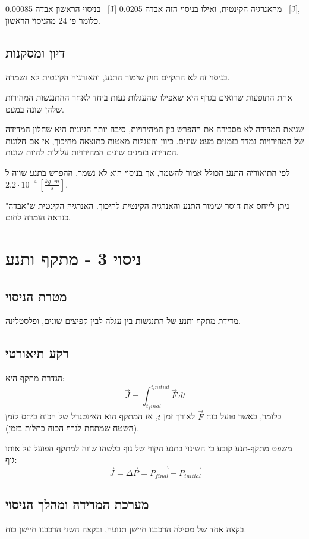 \documentclass[14pt]{extarticle}
\begin{document}
בניסוי הראשון אבדה 0.00085 \, [J] מהאנרגיה הקינטית, ואילו בניסוי הזה אבדה 0.0205 \, [J], כלומר פי 24 מהניסוי הראשון.

\subsection*{דיון ומסקנות}

בניסוי זה לא התקיים חוק שימור התנע, והאנרגיה הקינטית לא נשמרה.

אחת התופעות שרואים בגרף היא שאפילו שהעגלות נעות ביחד  לאחר ההתנגשות המהירות שלהן שונה במעט.

שגיאת המדידה לא מסבירה את ההפרש בין המהירויות, סיבה יותר  הגיונית היא שחלון המדידה של המהירויות נמדד בזמנים מעט שונים.
כיוון והעגלות  מאטות כתוצאה מחיכוך, אז אם חלונות המדידה בזמנים שונים המהירויות עלולות להיות שונות.

לפי התיאוריה התנע הכולל אמור להשמר, אך בניסוי הוא לא נשמר. ההפרש בתנע שווה ל $2.2\cdot 10^{-4} \, [\frac{kg \cdot m}{s}]$.

ניתן לייחס את  חוסר שימור התנע  והאנרגיה  הקינטית לחיכוך. האנרגיה  הקינטית ש"אבדה" כנראה הומרה לחום.

\section*{ניסוי 3 - מתקף ותנע}
\subsection*{מטרת הניסוי}
מדידת מתקף ותנע של התנגשות בין עגלה לבין קפיצים שונים, ופלסטלינה.

\subsection*{רקע תיאורטי}
הגדרת מתקף היא:
\begin{equation}
    \vec{J} = \int_{t_final}^{t_initial} \vec{F} \, dt
\end{equation}
כלומר, כאשר פועל כוח $\vec{F}$ לאורך זמן  $t$, אז המתקף הוא  האינטגרל של הכוח ביחס לזמן (השטח שמתחת לגרף הכוח כתלות בזמן).

משפט מתקף-תנע קובע  כי  השינוי בתנע  הקווי של גוף כלשהו שווה למתקף הפועל על אותו גוף:
\begin{equation}
    \vec{J} = \Delta \vec{P} = \vec{P_{final}} - \vec{P_{initial}}
\end{equation}

\subsection*{מערכת המדידה ומהלך הניסוי}
בקצה אחד של מסילה הרכבנו  חיישן תנועה, ובקצה  השני  הרכבנו חיישן כוח.
\end{document}
